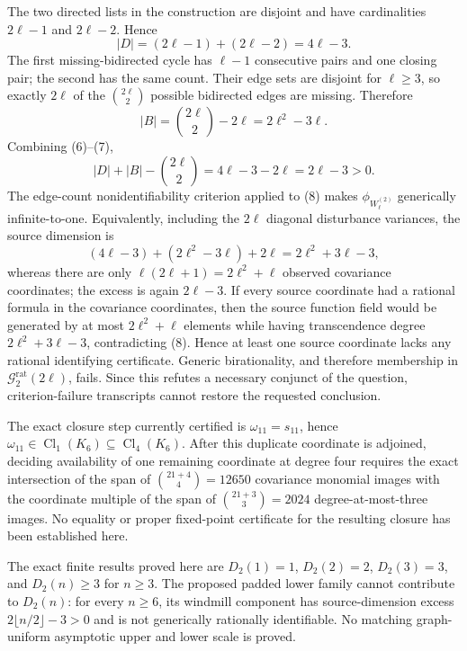 The two directed lists in the construction are disjoint and have cardinalities \(2\ell-1\) and \(2\ell-2\).  Hence
\[
 |D|=(2\ell-1)+(2\ell-2)=4\ell-3. \tag{6}
\]
The first missing-bidirected cycle has \(\ell-1\) consecutive pairs and one closing pair; the second has the same count.  Their edge sets are disjoint for \(\ell\geq3\), so exactly \(2\ell\) of the \(\binom{2\ell}{2}\) possible bidirected edges are missing.  Therefore
\[
 |B|=\binom{2\ell}{2}-2\ell=2\ell^2-3\ell. \tag{7}
\]
Combining (6)--(7),
\[
 |D|+|B|-\binom{2\ell}{2}
 =4\ell-3-2\ell=2\ell-3>0. \tag{8}
\]
The edge-count nonidentifiability criterion applied to (8) makes \(\phi_{W_{\ell}^{(2)}}\) generically infinite-to-one.  Equivalently, including the \(2\ell\) diagonal disturbance variances, the source dimension is
\[
 (4\ell-3)+(2\ell^2-3\ell)+2\ell=2\ell^2+3\ell-3,
\]
whereas there are only \(\ell(2\ell+1)=2\ell^2+\ell\) observed covariance coordinates; the excess is again \(2\ell-3\).  If every source coordinate had a rational formula in the covariance coordinates, then the source function field would be generated by at most \(2\ell^2+\ell\) elements while having transcendence degree \(2\ell^2+3\ell-3\), contradicting (8).  Hence at least one source coordinate lacks any rational identifying certificate.  Generic birationality, and therefore membership in \(\mathcal G_{2}^{\mathrm{rat}}(2\ell)\), fails.  Since this refutes a necessary conjunct of the question, criterion-failure transcripts cannot restore the requested conclusion.

The exact closure step currently certified is \(\omega_{11}=s_{11}\), hence \(\omega_{11}\in\operatorname{Cl}_1(K_6)\subseteq\operatorname{Cl}_4(K_6)\).  After this duplicate coordinate is adjoined, deciding availability of one remaining coordinate at degree four requires the exact intersection of the span of \(\binom{21+4}{4}=12650\) covariance monomial images with the coordinate multiple of the span of \(\binom{21+3}{3}=2024\) degree-at-most-three images.  No equality or proper fixed-point certificate for the resulting closure has been established here.

The exact finite results proved here are \(D_2(1)=1\), \(D_2(2)=2\), \(D_2(3)=3\), and \(D_2(n)\geq3\) for \(n\geq3\).  The proposed padded lower family cannot contribute to \(D_2(n)\): for every \(n\geq6\), its windmill component has source-dimension excess \(2\lfloor n/2\rfloor-3>0\) and is not generically rationally identifiable.  No matching graph-uniform asymptotic upper and lower scale is proved.

